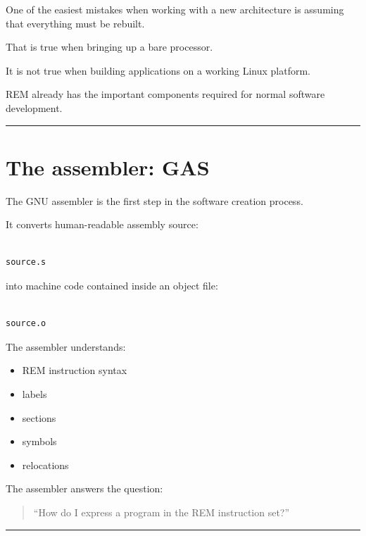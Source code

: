 \documentclass[
  oneside,
  openany]{book}
\providecommand{\tightlist}{%
  \setlength{\itemsep}{0pt}\setlength{\parskip}{0pt}}
\begin{document}
One of the easiest mistakes when working with a new architecture is
assuming that everything must be rebuilt.

That is true when bringing up a bare processor.

It is not true when building applications on a working Linux platform.

REM already has the important components required for normal software
development.

\begin{center}\rule{0.5\linewidth}{0.5pt}\end{center}

\hypertarget{the-assembler-gas}{%
\section{The assembler: GAS}\label{the-assembler-gas}}

The GNU assembler is the first step in the software creation process.

It converts human-readable assembly source:

\begin{verbatim}

source.s
\end{verbatim}

into machine code contained inside an object file:

\begin{verbatim}

source.o
\end{verbatim}

The assembler understands:

\begin{itemize}
\tightlist
\item
  REM instruction syntax
\item
  labels
\item
  sections
\item
  symbols
\item
  relocations
\end{itemize}

The assembler answers the question:

\begin{quote}
``How do I express a program in the REM instruction set?''
\end{quote}

\begin{center}\rule{0.5\linewidth}{0.5pt}\end{center}
\end{document}

